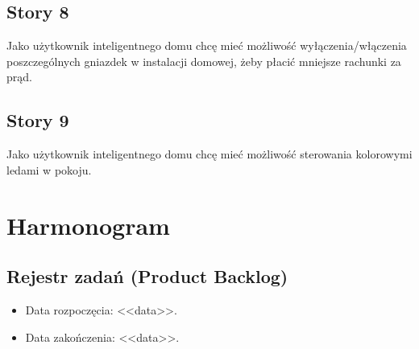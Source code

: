 	\subsection{Story 8}
	Jako użytkownik inteligentnego domu chcę mieć możliwość wyłączenia/włączenia poszczególnych gniazdek w instalacji domowej, żeby płacić mniejsze rachunki za prąd.
	
	\subsection{Story 9}
	Jako użytkownik inteligentnego domu chcę mieć możliwość sterowania kolorowymi ledami w pokoju.
	
	
	\section{Harmonogram}
	
	\subsection{Rejestr zadań (Product Backlog)}
	
	\begin{itemize}
		\item Data rozpoczęcia: <<data>>.
		\item  Data zakończenia: <<data>>.
	\end{itemize}